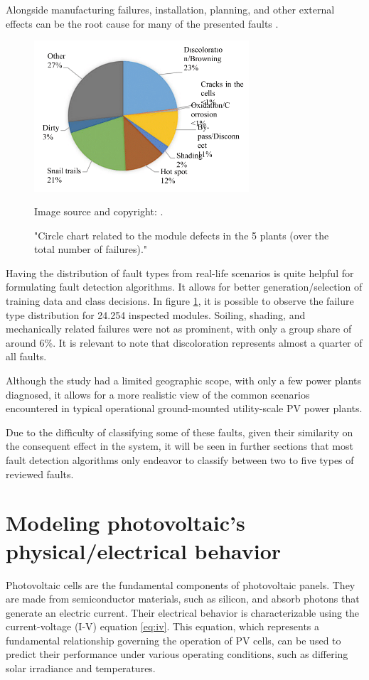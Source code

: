 Alongside manufacturing failures, installation, planning, and other external effects can be the root cause for many of the presented faults \cite{sunny}.

\begin{figure}[h]
    \centering
    \includegraphics[width=8cm]{figures/chapter2/chartfailsurvey.png} \caption{"Circle chart related to the module defects in the 5 plants (over the total number of failures)."} Image source and copyright: \cite{Grimaccia2017}.
    \label{fig:faultchart}
\end{figure}

Having the distribution of fault types from real-life scenarios is quite helpful for formulating fault detection algorithms. It allows for better generation/selection of training data and class decisions. In figure \ref{fig:faultchart}, it is possible to observe the failure type distribution for 24.254 inspected modules. Soiling, shading, and mechanically related failures were not as prominent, with only a group share of around 6\%. It is relevant to note that discoloration represents almost a quarter of all faults.

Although the study had a limited geographic scope, with only a few power plants diagnosed, it allows for a more realistic view of the common scenarios encountered in typical operational ground-mounted utility-scale PV power plants.

Due to the difficulty of classifying some of these faults, given their similarity on the consequent effect in the system, it will be seen in further sections that most fault detection algorithms only endeavor to classify between two to five types of reviewed faults.

\section{Modeling photovoltaic's physical/electrical behavior}

Photovoltaic cells are the fundamental components of photovoltaic panels. They are made from semiconductor materials, such as silicon,  and absorb photons that generate an electric current. Their electrical behavior is characterizable using the current-voltage (I-V) equation \ref{eq:iv}. This equation, which represents a fundamental relationship governing the operation of PV cells, can be used to predict their performance under various operating conditions, such as differing solar irradiance and temperatures.

